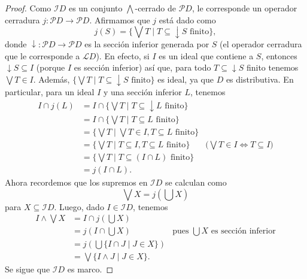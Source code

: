 \documentclass[12pt,letterpaper,titlepage]{article}
\theoremstyle{definition}
\newcommand\Sup{\bigvee}
\newcommand\down{{\downarrow}}
\renewcommand\inf{\wedge}
\newcommand\Inf{\bigwedge}
\renewcommand\cal[1]{\mathcal{#1}}
\newcommand\<{\langle}
\renewcommand\>{\rangle}
\begin{document}
\begin{proof}
    Como $\cal ID$ es un conjunto $\Inf$-cerrado de $\cal PD$,
    le corresponde un operador cerradura $j:\cal PD\to\cal PD$.
    Afirmamos que $j$ está dado como
    \[
        j(S) = \{\Sup T\mid T\subseteq\down S\text{ finito}\},
    \]
    donde $\down:\cal PD\to\cal PD$ es la sección inferior
    generada por $S$ (el operador
    cerradura que le corresponde a $\cal LD$).
    En efecto, si $I$ es un ideal que contiene a $S$,
    entonces $\down S\subseteq I$ (porque $I$ es sección inferior)
    así que, para todo $T\subseteq\down S$ finito tenemos
    $\Sup T\in I$.
    Además, $\{\Sup T\mid T\subseteq\down S\text{ finito}\}$
    es ideal, ya que $D$ es distributiva.
    En particular, para un ideal $I$ y una sección inferior $L$,
    tenemos
    \begin{align*}
        I\cap j(L)
        &= I\cap\{\Sup T\mid T\subseteq\down L\text{ finito}\} \\
        &= I\cap\{\Sup T\mid T\subseteq L\text{ finito}\} \\
        &= \{\Sup T\mid\Sup T\in I,T\subseteq L\text{ finito}\}
        \\
        &= \{\Sup T\mid T\subseteq I,T\subseteq L\text{ finito}\}
            & \text{(}\Sup T\in I \iff T\subseteq I\text{)} \\
        &= \{\Sup T\mid T\subseteq(I\cap L)\text{ finito}\} \\
        &= j(I\cap L).
    \end{align*}
    Ahora recordemos que los supremos en $\cal ID$ se calculan como
    \[
        \Sup X = j(\bigcup X)
    \]
    para $X\subseteq\cal ID$.
    Luego, dado $I\in\cal ID$, tenemos
    \begin{align*}
        I\inf\Sup X
        &= I\cap j(\bigcup X) \\
        &= j(I\cap\bigcup X)
            &\text{pues $\bigcup X$ es sección inferior} \\
        &= j(\bigcup\{I\cap J\mid J\in X\}) \\
        &= \Sup\{I\inf J\mid J\in X\}.
    \end{align*}
    Se sigue que $\cal ID$ es marco.
\end{proof}
\end{document}
